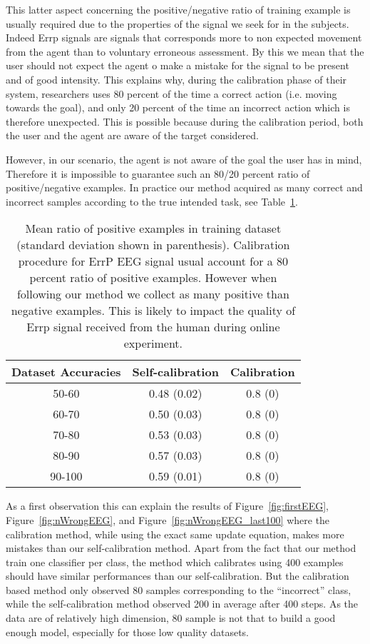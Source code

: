 This latter aspect concerning the positive/negative ratio of training example is usually required due to the properties of the signal we seek for in the subjects. Indeed Errp signals are signals that corresponds more to non expected movement from the agent than to voluntary erroneous assessment. By this we mean that the user should not expect the agent o make a mistake for the signal to be present and of good intensity. This explains why, during the calibration phase of their system, researchers uses 80 percent of the time a correct action (i.e. moving towards the goal), and only 20 percent of the time an incorrect action which is therefore unexpected. This is possible because during the calibration period, both the user and the agent are aware of the target considered.

However, in our scenario, the agent is not aware of the goal the user has in mind, Therefore it is impossible to guarantee such an 80/20 percent ratio of positive/negative examples. In practice our method acquired as many correct and incorrect samples according to the true intended task, see Table~\ref{tab:correctLabelRatio}.

\begin{table}
\centering
{}
\begin{tabular}{c c c}
Dataset Accuracies & Self-calibration & Calibration \\ \hline
50-60 & 0.48 (0.02) & 0.8 (0) \\
60-70 & 0.50 (0.03) & 0.8 (0) \\
70-80 & 0.53 (0.03) & 0.8 (0) \\
80-90 & 0.57 (0.03) & 0.8 (0) \\
90-100 & 0.59 (0.01) & 0.8 (0) \\
\end{tabular}
\caption{Mean ratio of positive examples in training dataset (standard deviation shown in parenthesis). Calibration procedure for ErrP EEG signal usual account for a 80 percent ratio of positive examples. However when following our method we collect as many positive than negative examples. This is likely to impact the quality of Errp signal received from the human during online experiment.}
\label{tab:correctLabelRatio}
\end{table}

As a first observation this can explain the results of Figure~\ref{fig:firstEEG}, Figure~\ref{fig:nWrongEEG}, and Figure~\ref{fig:nWrongEEG_last100} where the calibration method, while using the exact same update equation, makes more mistakes than our self-calibration method. Apart from the fact that our method train one classifier per class, the method which calibrates using 400 examples should have similar performances than our self-calibration. But the calibration based method only observed 80 samples corresponding to the ``incorrect'' class, while the self-calibration method observed 200 in average after 400 steps. As the data are of relatively high dimension, 80 sample is not that to build a good enough model, especially for those low quality datasets.

